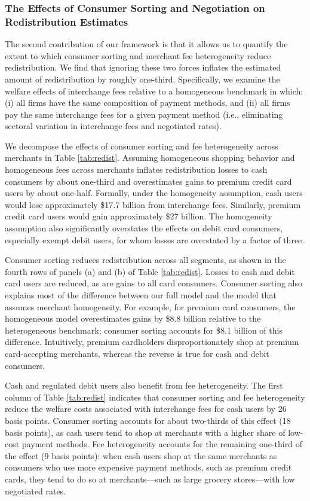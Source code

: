 \documentclass[11pt,english]{article}
\theoremstyle{remark}
\begin{document}
\subsubsection{The Effects of Consumer Sorting and Negotiation on Redistribution Estimates}

The second contribution of our framework is that it allows us to quantify the extent to which consumer sorting and merchant fee heterogeneity reduce redistribution. We find that ignoring these two forces inflates the estimated amount of redistribution by roughly one-third. Specifically, we examine the welfare effects of interchange fees relative to a homogeneous benchmark in which: (i) all firms have the same composition of payment methods, and (ii) all firms pay the same interchange fees for a given payment method (i.e., eliminating sectoral variation in interchange fees and negotiated rates).

We decompose the effects of consumer sorting and fee heterogeneity across merchants in Table \ref{tab:redist}. Assuming homogeneous shopping behavior and homogeneous fees across merchants inflates redistribution losses to cash consumers by about one-third and overestimates gains to premium credit card users by about one-half. Formally, under the homogeneity assumption, cash users would lose approximately \$17.7 billion from interchange fees. Similarly, premium credit card users would gain approximately \$27 billion. The homogeneity assumption also significantly overstates the effects on debit card consumers, especially exempt debit users, for whom losses are overstated by a factor of three.

Consumer sorting reduces redistribution across all segments, as shown in the fourth rows of panels (a) and (b) of Table \ref{tab:redist}. Losses to cash and debit card users are reduced, as are gains to all card consumers. Consumer sorting also explains most of the difference between our full model and the model that assumes merchant homogeneity. For example, for premium card consumers, the homogeneous model overestimates gains by \$8.8 billion relative to the heterogeneous benchmark; consumer sorting accounts for \$8.1 billion of this difference. Intuitively, premium cardholders disproportionately shop at premium card-accepting merchants, whereas the reverse is true for cash and debit consumers.

Cash and regulated debit users also benefit from fee heterogeneity. The first column of Table \ref{tab:redist} indicates that consumer sorting and fee heterogeneity reduce the welfare costs associated with interchange fees for cash users by 26 basis points. Consumer sorting accounts for about two-thirds of this effect (18 basis points), as cash users tend to shop at merchants with a higher share of low-cost payment methods. Fee heterogeneity accounts for the remaining one-third of the effect (9 basis points): when cash users shop at the same merchants as consumers who use more expensive payment methods, such as premium credit cards, they tend to do so at merchants---such as large grocery stores---with low negotiated rates. 
\end{document}
